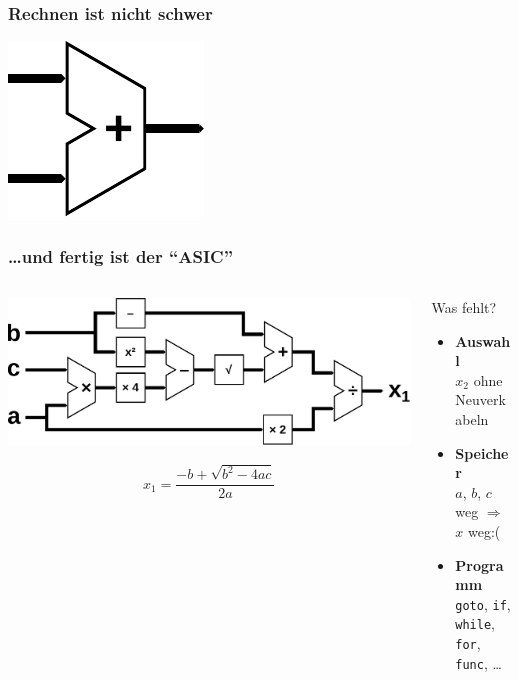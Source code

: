 \documentclass[t,aspectratio=169]{beamer}
\begin{document}
\begin{frame}
  \frametitle{Rechnen ist nicht schwer}

  \begin{center}
    \includegraphics[height=.7\textheight]{adder.pdf}
  \end{center}
\end{frame}

\begin{frame}
  \frametitle{\ldots und fertig ist der \enquote{ASIC}}

  \begin{columns}
    \begin{column}{.45\textwidth}
      \begin{center}
        \includegraphics[width=\linewidth]{abc-formel.pdf}

        \[ x_1 = \frac{-b + \sqrt{b^2 - 4ac}}{2a} \]
      \end{center}
    \end{column}
    \begin{column}{.45\textwidth}
      Was fehlt?
      \begin{itemize}
      \item \textbf{Auswahl}\\
        $x_2$ ohne Neuverkabeln
      \item \textbf{Speicher}\\
        $a$, $b$, $c$ weg $\Rightarrow$ $x$ weg\quad :(
      \item \textbf{Programm}\\
        \texttt{goto}, \texttt{if}, \texttt{while}, \texttt{for}, \texttt{func}, \ldots
      \end{itemize}
    \end{column}
  \end{columns}
\end{frame}
\end{document}
